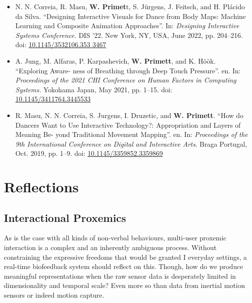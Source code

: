 \begin{itemize}

        
    
    \item N. N. Correia, R. Masu, \textbf{W. Primet}t, S. Jürgens, J. Feitsch, and H. Plácido da Silva.
    “Designing Interactive Visuals for Dance from Body Maps: Machine Learning and
    Composite Animation Approaches”. In: \textit{Designing Interactive Systems Conference.}
    DIS ’22. New York, NY, USA, June 2022, pp. 204–216. doi: \url{10.1145/3532106.353
    3467}
    
    \item A. Jung, M. Alfaras, P. Karpashevich, \textbf{W. Primett}, and K. Höök. “Exploring Aware-
    ness of Breathing through Deep Touch Pressure”. en. In: \textit{Proceedings of the 2021 CHI
    Conference on Human Factors in Computing Systems.} Yokohama Japan, May 2021,
    pp. 1–15. doi: \url{10.1145/3411764.3445533}
    
    \item R. Masu, N. N. Correia, S. Jurgens, I. Druzetic, and \textbf{W. Primett}. “How do Dancers
    Want to Use Interactive Technology?: Appropriation and Layers of Meaning Be-
    yond Traditional Movement Mapping”. en. In: \textit{Proceedings of the 9th International Conference on Digital and Interactive Arts}. Braga Portugal, Oct. 2019, pp. 1–9. doi: \url{10.1145/3359852.3359869}
\end{itemize}

\section{Reflections}

\subsection{Interactional Proxemics}
As is the case with all kinds of non-verbal behaviours, multi-user proxemic interaction is a complex and an inherently ambiguous process. Without constraining the expressive freedoms that would be granted I everyday settings, a real-time biofeedback system should reflect on this. Though, how do we produce meaningful representations when the raw sensor data is desperately limited in dimensionality and temporal scale? Even more so than data from inertial motion sensors  or indeed motion capture.  

